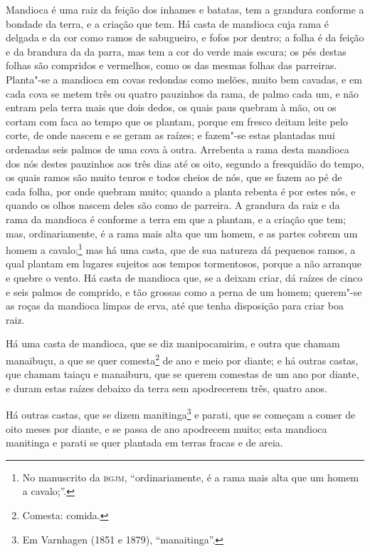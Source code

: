 Mandioca é uma raiz da feição dos inhames e batatas, tem a grandura conforme a bondade da
terra, e a criação que tem. Há casta de mandioca cuja rama é delgada e da cor como ramos
de sabugueiro, e fofos por dentro; a folha é da feição e da brandura da da parra, mas tem
a cor do verde mais escura; os pés destas folhas são compridos e vermelhos, como os das
mesmas folhas das parreiras. Planta"-se a mandioca em covas redondas como melões, muito bem
cavadas, e em cada cova se metem três ou quatro pauzinhos da rama, de palmo cada um, e não
entram pela terra mais que dois dedos, os quais paus quebram à mão, ou os cortam com faca
ao tempo que os plantam, porque em fresco deitam leite pelo corte, de onde nascem e se
geram as raízes; e fazem"-se estas plantadas mui ordenadas seis palmos de uma cova à outra.
Arrebenta a rama desta mandioca dos nós destes pauzinhos aos três dias até os oito,
segundo a fresquidão do tempo, os quais ramos são muito tenros e todos cheios de nós, que
se fazem ao pé de cada folha, por onde quebram muito; quando a planta rebenta é por estes
nós, e quando os olhos nascem deles são como de parreira. A grandura da raiz e da rama da
mandioca é conforme a terra em que a plantam, e a criação que tem; mas, ordinariamente, é
a rama mais alta que um homem, e as partes cobrem um homem a cavalo;\footnote{ No
manuscrito da \textsc{bgjm}, ``ordinariamente, é a rama mais alta que um homem a
cavalo;''.} mas há uma casta, que de sua natureza dá pequenos ramos, a qual plantam em
lugares sujeitos aos tempos tormentosos, porque a não arranque e quebre o vento. Há casta
de mandioca que, se a deixam criar, dá raízes de cinco e seis palmos de comprido, e tão
grossas como a perna de um homem; querem"-se as roças da mandioca limpas de erva, até que
tenha disposição para criar boa raiz.

Há uma casta de mandioca, que se diz manipocamirim, e outra que chamam manaibuçu, a que se
quer comesta\footnote{ Comesta: comida.} de ano e meio por diante; e há outras
castas, que chamam taiaçu e manaiburu, que se querem comestas de um ano por diante, e
duram estas raízes debaixo da terra sem apodrecerem três, quatro anos.

Há outras castas, que se dizem manitinga\footnote{ Em Varnhagen (1851 e 1879),
``manaitinga''.} e parati, que se começam a comer de oito meses por diante, e se passa de
ano apodrecem muito; esta mandioca manitinga e parati se quer plantada em terras fracas e
de areia.

